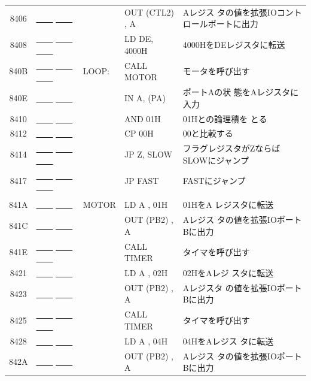 \begin{description}
\begin{table}
\begin{center}
\begin{tabular}{|c|l|ll|l|}
   8406 & \underline{~~~~} \underline{~~~~}    &  &     OUT (CTL2) , A& Aレジス
                    タの値を拡張IOコントロールポートに出力\\
   8408 & \underline{~~~~} \underline{~~~~} \underline{~~~~}  &  &     LD DE,
                4000H& 4000HをDEレジスタに転送\\
   840B & \underline{~~~~} \underline{~~~~} \underline{~~~~} &   LOOP:& CALL
                MOTOR& モータを呼び出す\\
   840E & \underline{~~~~} \underline{~~~~}     &  &     IN A, (PA)& ポートAの状
                    態をAレジスタに入力\\
   8410 & \underline{~~~~} \underline{~~~~}    &  &     AND 01H& 01Hとの論理積を
                    とる\\
   8412 & \underline{~~~~} \underline{~~~~}     &  &     CP 00H& 00と比較する\\
   8414 & \underline{~~~~} \underline{~~~~} \underline{~~~~}  &  &     JP Z,
                SLOW& フラグレジスタがZならばSLOWにジャンプ\\
   8417 & \underline{~~~~} \underline{~~~~} \underline{~~~~} &  &     JP FAST&
                    FASTにジャンプ\\
        &          &  &     &\\
   841A & \underline{~~~~} \underline{~~~~}    &   MOTOR&    LD A , 01H& 01HをA
                    レジスタに転送\\
   841C & \underline{~~~~} \underline{~~~~}     &  &     OUT (PB2) , A& Aレジス
                    タの値を拡張IOポートBに出力\\
   841E & \underline{~~~~} \underline{~~~~} \underline{~~~~} &  &     CALL
                TIMER& タイマを呼び出す\\
   8421 & \underline{~~~~} \underline{~~~~}     &  &     LD A , 02H& 02HをAレジ
                    スタに転送\\
   8423 & \underline{~~~~} \underline{~~~~}    &  &     OUT (PB2) , A& Aレジスタ
                    の値を拡張IOポートBに出力\\
   8425 & \underline{~~~~} \underline{~~~~} \underline{~~~~} &  &     CALL
                TIMER& タイマを呼び出す\\
   8428 & \underline{~~~~} \underline{~~~~}    &  &     LD A , 04H& 04HをAレジス
                    タに転送\\
   842A & \underline{~~~~} \underline{~~~~}    &  &     OUT (PB2) , A & Aレジス
                    タの値を拡張IOポートBに出力\\

\end{tabular}
\end{center}
\end{table}
\end{description}

